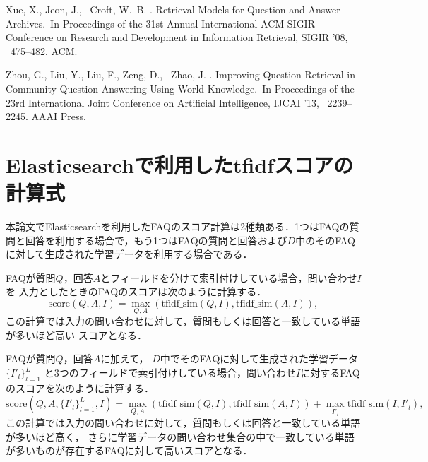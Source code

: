 \documentclass[japanese]{jnlp_1.4}
\begin{document}
\begin{thebibliography}{}
Xue, X., Jeon, J., \BBA\ Croft, W.~B. \BBCP.
\newblock \BBOQ Retrieval Models for Question and Answer Archives.\BBCQ\
\newblock In {\Bem Proceedings of the 31st Annual International ACM SIGIR
  Conference on Research and Development in Information Retrieval}, SIGIR '08,
  \mbox{\BPGS\ 475--482}. ACM.

Zhou, G., Liu, Y., Liu, F., Zeng, D., \BBA\ Zhao, J. \BBCP.
\newblock \BBOQ Improving Question Retrieval in Community Question Answering
  Using World Knowledge.\BBCQ\
\newblock In {\Bem Proceedings of the 23rd International Joint Conference on
  Artificial Intelligence}, IJCAI '13, \mbox{\BPGS\ 2239--2245}. AAAI Press.

\end{thebibliography}




\appendix

\section{Elasticsearchで利用したtfidfスコアの計算式}\label{ap:es}

本論文でElasticsearchを利用したFAQのスコア計算は2種類ある．1つはFAQの質問と回答を利用する場合で，もう1つはFAQの質問と回答および$D$中のそのFAQに対して生成された学習データを利用する場合である．

FAQが質問$Q$，回答$A$とフィールドを分けて索引付けしている場合，問い合わせ$I$を
入力としたときのFAQのスコアは次のように計算する．
\pagebreak
\begin{equation}
  \textrm{score}(Q, A, I) = \max_{Q,A}(\textrm{tfidf\_sim}(Q, I), \textrm{tfidf\_sim}(A, I)),
  \label{eq:es-base}
\end{equation}
この計算では入力の問い合わせに対して，質問もしくは回答と一致している単語が多いほど高い
スコアとなる．

FAQが質問$Q$，回答$A$に加えて，
$D$中でそのFAQに対して生成された学習データ$\{I'_l\}_{l=1}^L$
と3つのフィールドで索引付けしている場合，問い合わせ$I$に対するFAQのスコアを次のように計算する．
\begin{equation}
  \textrm{score}(Q, A, \{I'_l\}_{l=1}^L, I) = \max_{Q,A}(\textrm{tfidf\_sim}(Q, I), \textrm{tfidf\_sim}(A, I)) + \max_{{I'}_{l}} \textrm{tfidf\_sim}(I, I'_l),
  \label{eq:es}
\end{equation}
この計算では入力の問い合わせに対して，質問もしくは回答と一致している単語が多いほど高く，
さらに学習データの問い合わせ集合の中で一致している単語が多いものが存在するFAQに対して高いスコアとなる．
\end{document}
